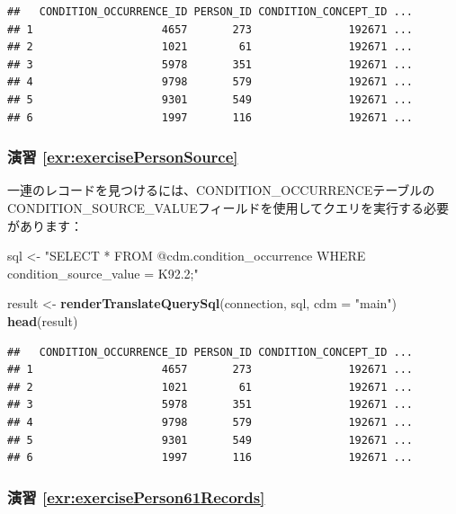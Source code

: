 \documentclass[
  11pt]{book}
\newenvironment{Shaded}{\begin{snugshade}}{\end{snugshade}}
\newcommand{\AttributeTok}[1]{\textcolor[rgb]{0.13,0.29,0.53}{#1}}
\newcommand{\FunctionTok}[1]{\textcolor[rgb]{0.13,0.29,0.53}{\textbf{#1}}}
\newcommand{\NormalTok}[1]{#1}
\newcommand{\OtherTok}[1]{\textcolor[rgb]{0.56,0.35,0.01}{#1}}
\newcommand{\StringTok}[1]{\textcolor[rgb]{0.31,0.60,0.02}{#1}}
\theoremstyle{definition}
\theoremstyle{definition}
\theoremstyle{definition}
\theoremstyle{definition}
\theoremstyle{remark}
\begin{document}
\begin{verbatim}
##   CONDITION_OCCURRENCE_ID PERSON_ID CONDITION_CONCEPT_ID ...
## 1                    4657       273               192671 ...
## 2                    1021        61               192671 ...
## 3                    5978       351               192671 ...
## 4                    9798       579               192671 ...
## 5                    9301       549               192671 ...
## 6                    1997       116               192671 ...
\end{verbatim}

\subsubsection*{演習 \ref{exr:exercisePersonSource}}\label{ux6f14ux7fd2-refexrexercisepersonsource}

一連のレコードを見つけるには、CONDITION\_OCCURRENCEテーブルのCONDITION\_SOURCE\_VALUEフィールドを使用してクエリを実行する必要があります：

\begin{Shaded}
\begin{Highlighting}[]
\NormalTok{sql }\OtherTok{\textless{}{-}} \StringTok{"SELECT *}
\StringTok{FROM @cdm.condition\_occurrence}
\StringTok{WHERE condition\_source\_value = \textquotesingle{}K92.2\textquotesingle{};"}

\NormalTok{result }\OtherTok{\textless{}{-}} \FunctionTok{renderTranslateQuerySql}\NormalTok{(connection, sql, }\AttributeTok{cdm =} \StringTok{"main"}\NormalTok{)}
\FunctionTok{head}\NormalTok{(result)}
\end{Highlighting}
\end{Shaded}

\begin{verbatim}
##   CONDITION_OCCURRENCE_ID PERSON_ID CONDITION_CONCEPT_ID ...
## 1                    4657       273               192671 ...
## 2                    1021        61               192671 ...
## 3                    5978       351               192671 ...
## 4                    9798       579               192671 ...
## 5                    9301       549               192671 ...
## 6                    1997       116               192671 ...
\end{verbatim}

\subsubsection*{演習 \ref{exr:exercisePerson61Records}}\label{ux6f14ux7fd2-refexrexerciseperson61records}
\end{document}

